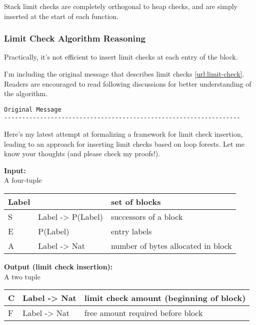 Stack limit checks are completely orthogonal to heap checks, and are simply
inserted at the start of each function.

\subsubsection{Limit Check Algorithm Reasoning}
Practically, it's not efficient to insert limit checks at each
entry of the block.

I'm including the original message that describes limit checks
\ref{url:limit-check}. Readers are encouraged to read following
discussions for better understanding of the algorithm.

\begin{verbatim}
Original Message
------------------------------------------------------------------
\end{verbatim}

Here's my latest attempt at formalizing a framework for limit check
insertion, leading to an approach for inserting limit checks based on
loop forests.  Let me know your thoughts (and please check my
proofs!).

\noindent\textbf{Input:}\\
\noindent A four-tuple

\begin{tabular}{|l|l|l|}
  \hline
  Label	&		   &	set of blocks\\\hline
  S	& Label -> P(Label)&	successors of a block\\\hline
  E	& P(Label)	   &	entry labels\\\hline
  A	& Label -> Nat	   &	number of bytes allocated in block\\\hline
\end{tabular}

\noindent\textbf{Output (limit check insertion):}\\
\noindent A two tuple

\begin{tabular}{|l|l|l|}
  \hline
  C	& Label -> Nat		& limit check amount (beginning of block)\\\hline
  F	& Label -> Nat		& free amount required before block\\
  \hline
\end{tabular}

